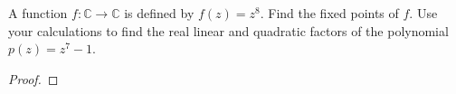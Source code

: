 \begin{problem}{1}
  A function $f:\mathbb{C} \to \mathbb{C}$ is defined by $f(z) = z^8$. Find the fixed points of $f$.
  Use your calculations to find the real linear and quadratic factors of the polynomial $p(z) = z^7 - 1$.
\end{problem}

\begin{proof}
\end{proof}
\newpage
